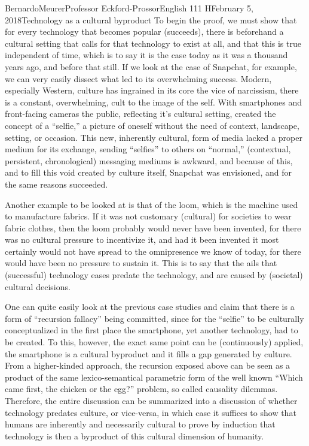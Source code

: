 \documentclass[12pt,letterpaper]{article}
\begin{document}
\begin{mla}{Bernardo}{Meurer}{Professor Eckford-Prossor}{English 111 H}{February 5, 2018}{Technology as a cultural byproduct}
    To begin the proof, we must show that for every technology that becomes popular (succeeds), there is beforehand a cultural setting that calls for that technology to exist at all, and that this is true independent of time, which is to say it is the case today as it was a thousand years ago, and before that still. If we look at the case of Snapchat, for example, we can very easily dissect what led to its overwhelming success. Modern, especially Western, culture has ingrained in its core the vice of narcissism, there is a constant, overwhelming, cult to the image of the self. With smartphones and front-facing cameras the public, reflecting it's cultural setting, created the concept of a ``selfie,'' a picture of oneself without the need of context, landscape, setting, or occasion. This new, inherently cultural, form of media lacked a proper medium for its exchange, sending ``selfies'' to others on ``normal,'' (contextual, persistent, chronological) messaging mediums is awkward, and because of this, and to fill this void created by culture itself, Snapchat was envisioned, and for the same reasons succeeded.

    Another example to be looked at is that of the loom, which is the machine used to manufacture fabrics. If it was not customary (cultural) for societies to wear fabric clothes, then the loom probably would never have been invented, for there was no cultural pressure to incentivize it, and had it been invented it most certainly would not have spread to the omnipresence we know of today, for there would have been no pressure to sustain it. This is to say that the ails that (successful) technology eases predate the technology, and are caused by (societal) cultural decisions.

    One can quite easily look at the previous case studies and claim that there is a form of ``recursion fallacy'' being committed, since for the ``selfie'' to be culturally conceptualized in the first place the smartphone, yet another technology, had to be created. To this, however, the exact same point can be (continuously) applied, the smartphone is a cultural byproduct and it fills a gap generated by culture. From a higher-kinded approach, the recursion exposed above can be seen as a product of the same lexico-semantical parametric form of the well known ``Which came first, the chicken or the egg?'' problem, so called causality dilemmas. Therefore, the entire discussion can be summarized into a discussion of whether technology predates culture, or vice-versa, in which case it suffices to show that humans are inherently and necessarily cultural to prove by induction that technology is then a byproduct of this cultural dimension of humanity.


\end{mla}
\end{document}
